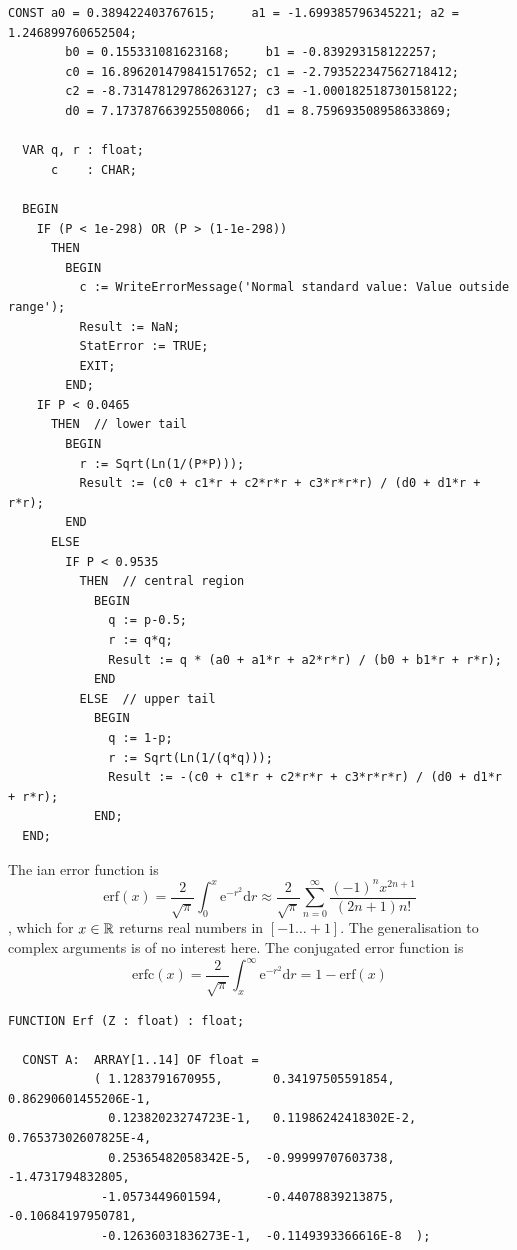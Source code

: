 \begin{refsection}
\begin{lstlisting}[caption=Normal standard value]
  CONST a0 = 0.389422403767615;     a1 = -1.699385796345221; a2 = 1.246899760652504;
        b0 = 0.155331081623168;     b1 = -0.839293158122257;
        c0 = 16.896201479841517652; c1 = -2.793522347562718412;
        c2 = -8.731478129786263127; c3 = -1.000182518730158122;
        d0 = 7.173787663925508066;  d1 = 8.759693508958633869;

  VAR q, r : float;
      c    : CHAR;

  BEGIN
    IF (P < 1e-298) OR (P > (1-1e-298))
      THEN
        BEGIN
          c := WriteErrorMessage('Normal standard value: Value outside range');
          Result := NaN;
          StatError := TRUE;
          EXIT;
        END;
    IF P < 0.0465
      THEN  // lower tail
        BEGIN
          r := Sqrt(Ln(1/(P*P)));
          Result := (c0 + c1*r + c2*r*r + c3*r*r*r) / (d0 + d1*r + r*r);
        END
      ELSE
        IF P < 0.9535
          THEN  // central region
            BEGIN
              q := p-0.5;
              r := q*q;
              Result := q * (a0 + a1*r + a2*r*r) / (b0 + b1*r + r*r);
            END
          ELSE  // upper tail
            BEGIN
              q := 1-p;
              r := Sqrt(Ln(1/(q*q)));
              Result := -(c0 + c1*r + c2*r*r + c3*r*r*r) / (d0 + d1*r + r*r);
            END;
  END;
\end{lstlisting}

The ian error function is
\begin{equation}
   \mathrm{erf}(x) = \frac{2}{\sqrt{\pi}} \int_{0}^{x} \mathrm{e}^{-r^2} \mathrm{d}r \approx \frac{2}{\sqrt{\pi}} \sum_{n=0}^{\infty} \frac{(-1)^n x^{2n + 1}}{(2n + 1) n!}
 \end{equation}
, which for \( x \in \mathbb{R} \) returns real numbers in \( [-1\ldots +1] \). The generalisation to complex arguments is of no interest here. The conjugated error function is
\begin{equation}
  \mathrm{erfc} (x) = \frac{2}{\sqrt{\pi}} \int_{x}^{\infty} \mathrm{e}^{-r^2} \mathrm{d}r = 1 - \mathrm{erf}(x)
\end{equation}

\begin{lstlisting}[caption=Error function]
  FUNCTION Erf (Z : float) : float;

  CONST A:  ARRAY[1..14] OF float =
            ( 1.1283791670955,       0.34197505591854,     0.86290601455206E-1,
              0.12382023274723E-1,   0.11986242418302E-2,  0.76537302607825E-4,
              0.25365482058342E-5,  -0.99999707603738,    -1.4731794832805,
             -1.0573449601594,      -0.44078839213875,    -0.10684197950781,
             -0.12636031836273E-1,  -0.1149393366616E-8  );


\end{lstlisting}
\end{refsection}

